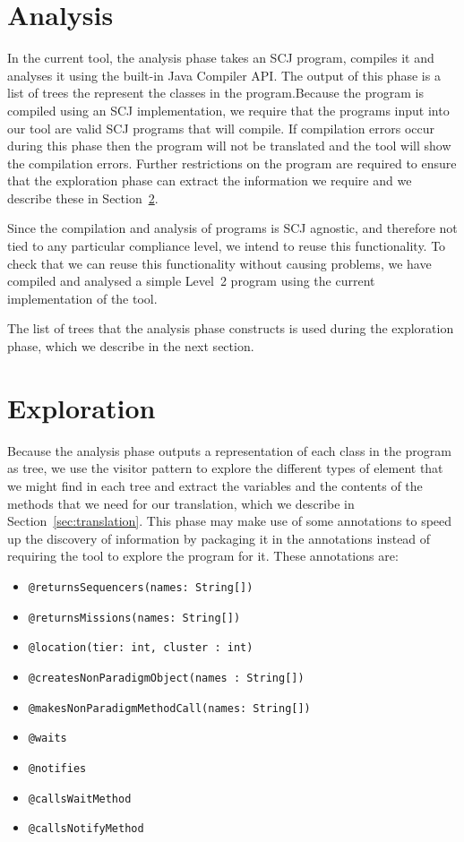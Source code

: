 \documentclass[10pt,a4paper]{article}
\begin{document}
\section{Analysis}
\label{sec:analysis}

In the current tool, the analysis phase takes an SCJ program, compiles it and analyses it using the built-in Java Compiler API. The output of this phase is a list of trees the represent the classes in the program.Because the program is compiled using an SCJ implementation, we require that the programs input into our tool are valid SCJ programs that will compile. If compilation errors occur during this phase then the program will not be translated and the tool will show the compilation errors. Further restrictions on the program are required to ensure that the exploration phase can extract the information we require and we describe these in Section~\ref{sec:exploration}.

Since the compilation and analysis of programs is SCJ agnostic, and therefore not tied to any particular compliance level, we intend to reuse this functionality. To check that we can reuse this functionality without causing problems, we have compiled and analysed a simple Level~2 program using the current implementation of the tool. 

The list of trees that the analysis phase constructs is used during the exploration phase, which we describe in the next section.

\section{Exploration}
\label{sec:exploration}

Because the analysis phase outputs a representation of each class in the program as tree, we use the visitor pattern to explore the different types of element that we might find in each tree and extract the variables and the contents of the methods that we need for our translation, which we describe in Section~\ref{sec:translation}. This phase may make use of some annotations to speed up the discovery of information by packaging it in the annotations instead of requiring the tool to explore the program for it. These annotations are:
\begin{itemize}
\item \texttt{@returnsSequencers(names: String[])}
\item \texttt{@returnsMissions(names: String[])}
\item \texttt{@location(tier: int, cluster : int)}
\item \texttt{@createsNonParadigmObject(names : String[])}
\item \texttt{@makesNonParadigmMethodCall(names: String[])}
\item \texttt{@waits}
\item \texttt{@notifies}
\item \texttt{@callsWaitMethod}
\item \texttt{@callsNotifyMethod}
\end{itemize}
\end{document}
